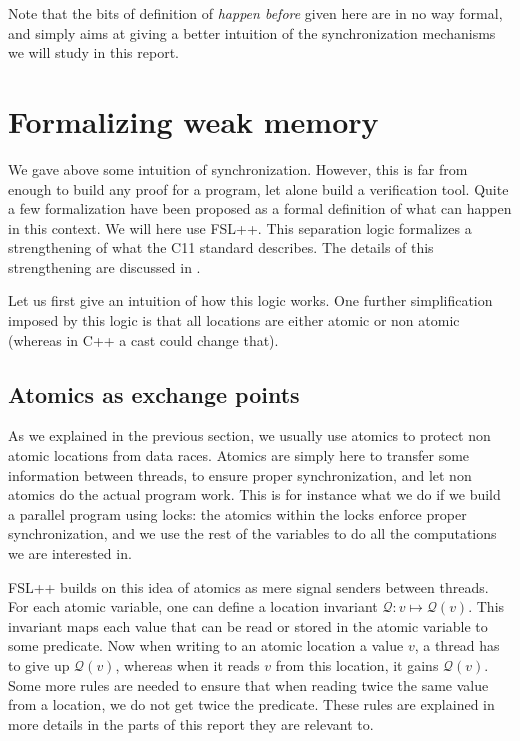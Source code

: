 Note that the bits of definition of \emph{happen before} given here are in no way formal, and simply aims at giving a better intuition of the synchronization mechanisms we will study in this report.

\section{Formalizing weak memory}
We gave above some intuition of synchronization. However, this is far from enough to build any proof for a program, let alone build a verification tool. Quite a few formalization have been proposed as a formal definition of what can happen in this context. We will here use FSL++\cite{fsl}. This separation logic formalizes a strengthening of what the C11 standard describes. The details of this strengthening are discussed in \cite{fsl}.

Let us first give an intuition of how this logic works. One further simplification imposed by this logic is that all locations are either atomic or non atomic (whereas in C++ a cast could change that).

\subsection{Atomics as exchange points}
As we explained in the previous section, we usually use atomics to protect non atomic locations from data races. Atomics are simply here to transfer some information between threads, to ensure proper synchronization, and let non atomics do the actual program work. This is for instance what we do if we build a parallel program using locks: the atomics within the locks enforce proper synchronization, and we use the rest of the variables to do all the computations we are interested in. 

FSL++ builds on this idea of atomics as mere signal senders between threads. For each atomic variable, one can define a location invariant $\mathcal{Q}: v \mapsto \mathcal{Q}(v)$. This invariant maps each value that can be read or stored in the atomic variable to some predicate. Now when writing to an atomic location a value $v$, a thread has to give up $\mathcal{Q}(v)$, whereas when it reads $v$ from this location, it gains $\mathcal{Q}(v)$. Some more rules are needed to ensure that when reading twice the same value from a location, we do not get twice the predicate. These rules are explained in more details in the parts of this report they are relevant to.

